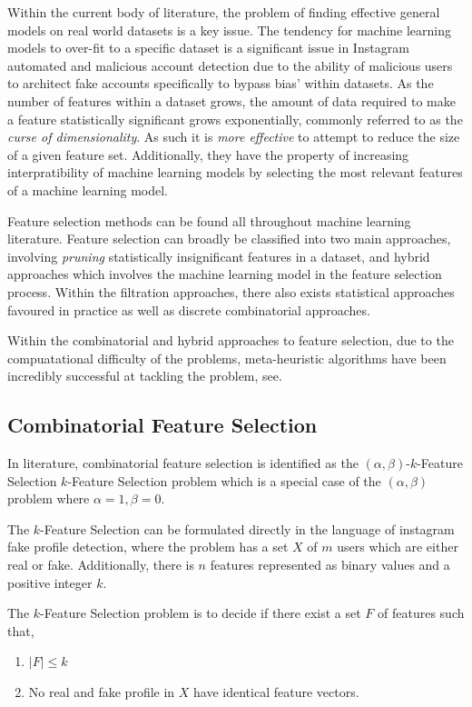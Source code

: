 \documentclass[conference]{IEEEtran}
\begin{document}
Within the current body of literature, the problem of finding effective general models on real world datasets is a key issue. The tendency for machine learning models to over-fit to a specific dataset is a significant issue in Instagram automated and malicious account detection due to the ability of malicious users to architect fake accounts specifically to bypass bias' within datasets. As the number of features within a dataset grows, the amount of data required to make a feature statistically significant grows exponentially, commonly referred to as the \textit{curse of dimensionality}. As such it is \textit{more effective} to attempt to reduce the size of a given feature set. Additionally, they have the property of increasing interpratibility of machine learning models by selecting the most relevant features of a machine learning model.

Feature selection methods can be found all throughout machine learning literature. Feature selection can broadly be classified into two main approaches, involving \textit{pruning} statistically insignificant features in a dataset, and hybrid approaches\cite{AkyonKalfaoglu2019,KaushikEtAl2022} which involves the machine learning model in the feature selection process. Within the filtration approaches, there also exists statistical approaches favoured in practice\cite{PedregosaEtAl2011} as well as discrete combinatorial approaches\cite{MathiesonEtAl2017}.

Within the combinatorial and hybrid approaches to feature selection, due to the compuatational difficulty of the problems, meta-heuristic algorithms have been incredibly successful at tackling the problem, see\cite{AkyonKalfaoglu2019,MathiesonEtAl2017}.

\subsection{Combinatorial Feature Selection}

In literature, combinatorial feature selection is identified as the $(\alpha,\beta)$-$k$-Feature Selection $k$-Feature Selection problem which is a special case of the $(\alpha,\beta)$ problem where $\alpha=1,\beta=0$.

\begin{definition}\label{def:k-feature-selection}
	The $k$-Feature Selection can be formulated directly in the language of instagram fake profile detection, where the problem has a set $X$ of $m$ users which are either real or fake. Additionally, there is $n$ features represented as binary values and a positive integer $k$.

	The $k$-Feature Selection problem is to decide if there exist a set $F$ of features such that,

	\begin{enumerate}
		\item $|F| \leq k$
		\item No real and fake profile in $X$ have identical feature vectors.
	\end{enumerate}
\end{definition}
\end{document}

